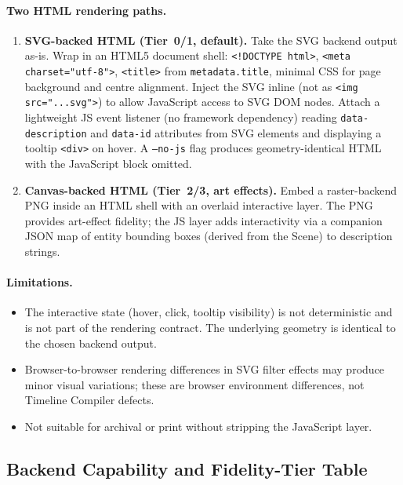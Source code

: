 \paragraph{Two HTML rendering paths.}
\begin{enumerate}
  \item \textbf{SVG-backed HTML (Tier~0/1, default).} Take the SVG backend output
        as-is. Wrap in an HTML5 document shell: \texttt{<!DOCTYPE html>},
        \texttt{<meta charset="utf-8">}, \texttt{<title>} from \texttt{metadata.title},
        minimal CSS for page background and centre alignment. Inject the SVG inline (not
        as \texttt{<img src="...svg">}) to allow JavaScript access to SVG DOM nodes.
        Attach a lightweight JS event listener (no framework dependency) reading
        \texttt{data-description} and \texttt{data-id} attributes from SVG elements
        and displaying a tooltip \texttt{<div>} on hover. A \texttt{--no-js} flag
        produces geometry-identical HTML with the JavaScript block omitted.
  \item \textbf{Canvas-backed HTML (Tier~2/3, art effects).} Embed a raster-backend PNG
        inside an HTML shell with an overlaid interactive layer. The PNG provides
        art-effect fidelity; the JS layer adds interactivity via a companion JSON map of
        entity bounding boxes (derived from the Scene) to description strings.
\end{enumerate}

\paragraph{Limitations.}
\begin{itemize}
  \item The interactive state (hover, click, tooltip visibility) is not deterministic and
        is not part of the rendering contract. The underlying geometry is identical to the
        chosen backend output.
  \item Browser-to-browser rendering differences in SVG filter effects may produce minor
        visual variations; these are browser environment differences, not Timeline Compiler
        defects.
  \item Not suitable for archival or print without stripping the JavaScript layer.
\end{itemize}

\subsection{Backend Capability and Fidelity-Tier Table}
\label{sec:backend-capability}

